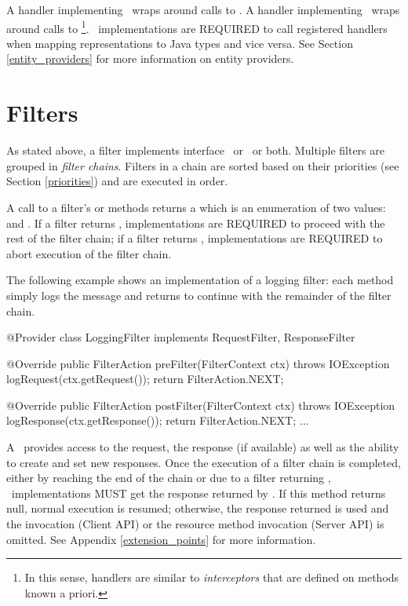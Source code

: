 A handler implementing \ReadFromHandler\ wraps around calls to . A handler implementing \WriteToHandler\ wraps around calls to  \footnote{In this sense, handlers are similar to {\em interceptors} that are defined on methods known a priori.}. \jaxrs\ implementations are REQUIRED to call registered handlers when mapping representations to Java types and vice versa. See Section \ref{entity_providers} for more information on entity providers.

\section{Filters}
\label{filters}

As stated above, a filter implements interface \RequestFilter\ or \ResponseFilter\ or both. Multiple filters are grouped in \emph{filter chains}. Filters in a chain are sorted based on their priorities (see Section \ref{priorities}) and are executed in order. 

A call to a filter's  or  methods returns a  which is an enumeration of two values:  and . If a filter returns , implementations are REQUIRED to proceed with the rest of the filter chain; if a filter returns , implementations are REQUIRED to abort execution of the filter chain. 

The following example shows an implementation of a logging filter: each method simply logs the message and returns  to continue with the remainder of the filter chain.

\begin{listing}{1}
@Provider
class LoggingFilter implements RequestFilter, ResponseFilter {

    @Override
    public FilterAction preFilter(FilterContext ctx) throws IOException {
        logRequest(ctx.getRequest());
        return FilterAction.NEXT;
    }

    @Override
    public FilterAction postFilter(FilterContext ctx) throws IOException {
        logResponse(ctx.getResponse());
        return FilterAction.NEXT;
    }
    ...
}
\end{listing}

A \FilterContext\ provides access to the request, the response (if available) as well as the ability to create and set new responses. Once the execution of a filter chain is completed, either by reaching the end of the chain or due to a filter returning , \jaxrs\ implementations MUST get the response returned by . If this method returns null, normal execution is resumed; otherwise, the response returned is used and the invocation (Client API) or the resource method invocation (Server API) is omitted.  See Appendix \ref{extension_points} for more information.


